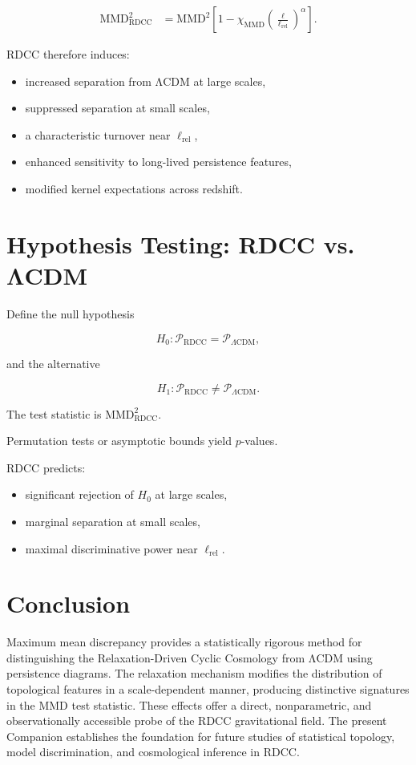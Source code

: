 \documentclass[11pt,a4paper]{article}
\begin{document}
\begin{align}
    \mathrm{MMD}^{2}_{\mathrm{RDCC}}
    &= \mathrm{MMD}^{2}
       \left[
         1 - \chi_{\mathrm{MMD}}
         \left(\frac{\ell}{\ell_{\mathrm{rel}}}\right)^{\alpha}
       \right].
\end{align}

RDCC therefore induces:

\begin{itemize}
    \item increased separation from ΛCDM at large scales,
    \item suppressed separation at small scales,
    \item a characteristic turnover near $\ell_{\mathrm{rel}}$,
    \item enhanced sensitivity to long-lived persistence features,
    \item modified kernel expectations across redshift.
\end{itemize}
\section{Hypothesis Testing: RDCC vs. ΛCDM}

Define the null hypothesis


\[
    H_{0}: \mathcal{P}_{\mathrm{RDCC}} = \mathcal{P}_{\Lambda\mathrm{CDM}},
\]


and the alternative


\[
    H_{1}: \mathcal{P}_{\mathrm{RDCC}} \neq \mathcal{P}_{\Lambda\mathrm{CDM}}.
\]



The test statistic is $\mathrm{MMD}^{2}_{\mathrm{RDCC}}$.

Permutation tests or asymptotic bounds yield $p$-values.

RDCC predicts:

\begin{itemize}
    \item significant rejection of $H_{0}$ at large scales,
    \item marginal separation at small scales,
    \item maximal discriminative power near $\ell_{\mathrm{rel}}$.
\end{itemize}
\section{Conclusion}

Maximum mean discrepancy provides a statistically rigorous method for 
distinguishing the Relaxation-Driven Cyclic Cosmology from ΛCDM using persistence 
diagrams. The relaxation mechanism modifies the distribution of topological 
features in a scale-dependent manner, producing distinctive signatures in the MMD 
test statistic. These effects offer a direct, nonparametric, and observationally 
accessible probe of the RDCC gravitational field. The present Companion establishes 
the foundation for future studies of statistical topology, model discrimination, 
and cosmological inference in RDCC.


\nocite{*}

\end{document}
